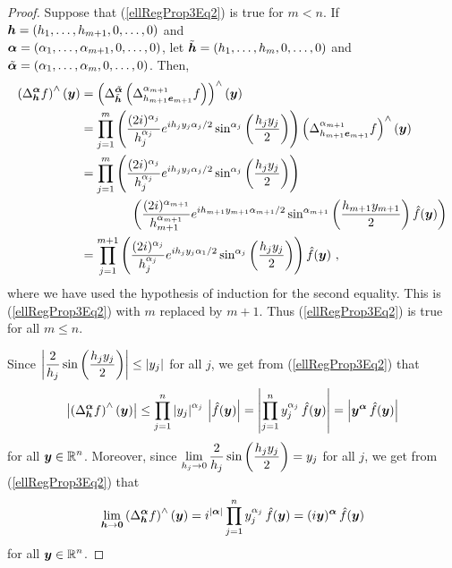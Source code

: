 \begin{proof}
Suppose that (\ref{ellRegProp3Eq2}) is true for $m < n$.  If
${\bm{h}} = (h_1,\ldots,h_{m+1},0,\ldots,0)$ and\\
${\bm{\alpha}} = (\alpha_1,\ldots,\alpha_{m+1},0,\ldots,0)$, let
$\tilde{{\bm{h}}} = (h_1,\ldots,h_m,0,\ldots,0)$ and
$\tilde{{\bm{\alpha}}} = (\alpha_1,\ldots,\alpha_m,0,\ldots,0)$.  Then,
\begin{align*}
\left(\Delta^{\VEC{\alpha}}_{\VEC{h}} f \right)^\wedge(\VEC{y})
&= \left( \Delta^{\tilde{\VEC{\alpha}}}_{\tilde{\VEC{h}}}
\left( \Delta^{\alpha_{m+1}}_{h_{m+1}\VEC{e}_{m+1}} f \right)\right)^\wedge
(\VEC{y}) \\
&= \prod_{j=1}^m \left(\frac{(2i)^{\alpha_j}}{h_j^{\alpha_j}}
e^{i h_j y_j \alpha_j/2}
\sin^{\alpha_j}\left(\frac{h_j y_j}{2}\right) \right)
\left( \Delta^{\alpha_{m+1}}_{h_{m+1}\VEC{e}_{m+1}} f \right)^\wedge(\VEC{y}) \\
&= \prod_{j=1}^m \left(\frac{(2i)^{\alpha_j}}{h_j^{\alpha_j}}
e^{i h_j y_j \alpha_j/2}
\sin^{\alpha_j}\left(\frac{h_j y_j}{2}\right) \right) \\
&\qquad\qquad \left( \frac{(2i)^{\alpha_{m+1}}}{h_{m+1}^{\alpha_{m+1}}}
e^{i h_{m+1} y_{m+1} \alpha_{m+1}/2}
\sin^{\alpha_{m+1}}\left(\frac{h_{m+1} y_{m+1}}{2}\right)
\hat{f}(\VEC{y}) \right) \\
& =\prod_{j=1}^{m+1} \left(\frac{(2i)^{\alpha_j}}{h_j^{\alpha_j}}
e^{i h_j y_j \alpha_1/2}
\sin^{\alpha_j}\left(\frac{h_j y_j}{2}\right) \right)\hat{f}(\VEC{y}) \ ,
\end{align*}
where we have used the hypothesis of induction for the second equality.
This is (\ref{ellRegProp3Eq2}) with $m$ replaced by $m+1$.
Thus (\ref{ellRegProp3Eq2}) is true for all $m \leq n$.

Since $\displaystyle \left| \frac{2}{h_j}
\sin\left(\frac{h_j y_j}{2}\right)\right| \leq |y_j|$ for all $j$, we
get from (\ref{ellRegProp3Eq2}) that
\begin{equation} \label{ellRegProp3Eq3}
\left| \left(\Delta^{{\bm{\alpha}}}_{{\bm{h}}} f\right)^\wedge({\bm{y}}) \right|
\leq \prod_{j=1}^n \left| y_j \right|^{\alpha_j}
\,\left| \hat{f}({\bm{y}})\right|
= \left| \prod_{j=1}^n y_j^{\alpha_j} \,\hat{f}({\bm{y}})\right|
= \left| {\bm{y}}^{{\bm{\alpha}}} \,\hat{f}({\bm{y}})\right|
\end{equation}
for all $\displaystyle {\bm{y}} \in \mathbb{R}^n$.  Moreover, since
$\displaystyle \lim_{h_j \to 0} \frac{2}{h_j} \sin\left(\frac{h_j y_j}{2}\right)
= y_j$ for all $j$, we get from (\ref{ellRegProp3Eq2}) that
\begin{equation} \label{ellRegProp3Eq4}
\lim_{{\bm{h}}\to {\bm{0}}}  \left(\Delta^{{\bm{\alpha}}}_{{\bm{h}}}
f\right)^\wedge({\bm{y}})
= i^{|{\bm{\alpha}}|} \prod_{j=1}^n y_j^{\alpha_j} \,\hat{f}({\bm{y}})
= (i{\bm{y}})^{{\bm{\alpha}}} \,\hat{f}({\bm{y}})
\end{equation}
for all $\displaystyle {\bm{y}} \in \mathbb{R}^n$.


\end{proof}
